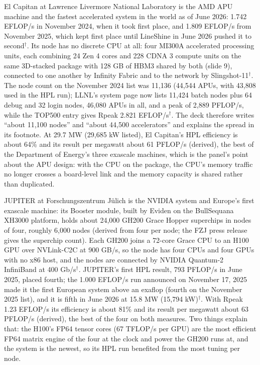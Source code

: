 \documentclass[11pt,letterpaper]{article}
\begin{document}
El Capitan at Lawrence Livermore National Laboratory is the AMD APU machine and the fastest accelerated system in the world as of June 2026: 1.742 EFLOP/s in November 2024, when it took first place, and 1.809 EFLOP/s from November 2025, which kept first place until LineShine in June 2026 pushed it to second$^\dagger$. Its node has no discrete CPU at all: four MI300A accelerated processing units, each combining 24 Zen 4 cores and 228 CDNA 3 compute units on the same 3D-stacked package with 128 GB of HBM3 shared by both (slide 9), connected to one another by Infinity Fabric and to the network by Slingshot-11$^\dagger$. The node count on the November 2024 list was 11,136 (44,544 APUs, with 43,808 used in the HPL run); LLNL's system page now lists 11,424 batch nodes plus 64 debug and 32 login nodes, 46,080 APUs in all, and a peak of 2,889 PFLOP/s, while the TOP500 entry gives Rpeak 2.821 EFLOP/s$^\dagger$. The deck therefore writes ``about 11,100 nodes'' and ``about 44,500 accelerators'' and explains the spread in its footnote. At 29.7 MW (29,685 kW listed), El Capitan's HPL efficiency is about 64\% and its result per megawatt about 61 PFLOP/s (derived), the best of the Department of Energy's three exascale machines, which is the panel's point about the APU design: with the CPU on the package, the CPU's memory traffic no longer crosses a board-level link and the memory capacity is shared rather than duplicated.

JUPITER at Forschungszentrum J\"ulich is the NVIDIA system and Europe's first exascale machine: its Booster module, built by Eviden on the BullSequana XH3000 platform, holds about 24,000 GH200 Grace Hopper superchips in nodes of four, roughly 6,000 nodes (derived from four per node; the FZJ press release gives the superchip count). Each GH200 joins a 72-core Grace CPU to an H100 GPU over NVLink-C2C at 900 GB/s, so the node has four CPUs and four GPUs with no x86 host, and the nodes are connected by NVIDIA Quantum-2 InfiniBand at 400 Gb/s$^\dagger$. JUPITER's first HPL result, 793 PFLOP/s in June 2025, placed fourth; the 1.000 EFLOP/s run announced on November 17, 2025 made it the first European system above an exaflop (fourth on the November 2025 list), and it is fifth in June 2026 at 15.8 MW (15,794 kW)$^\dagger$. With Rpeak 1.23 EFLOP/s its efficiency is about 81\% and its result per megawatt about 63 PFLOP/s (derived), the best of the four on both measures. Two things explain that: the H100's FP64 tensor cores (67 TFLOP/s per GPU) are the most efficient FP64 matrix engine of the four at the clock and power the GH200 runs at, and the system is the newest, so its HPL run benefited from the most tuning per node.
\end{document}

